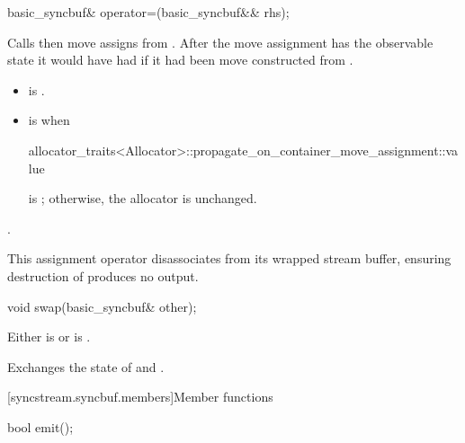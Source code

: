 %
\begin{itemdecl}
basic_syncbuf& operator=(basic_syncbuf&& rhs);
\end{itemdecl}

\begin{itemdescr}
\pnum
\effects
Calls  then
move assigns from .
After the move assignment 
has the observable state it would have had if
it had been move constructed from .

\pnum
\ensures
\begin{itemize}
\item
{} is .
\item
{} is  when
\begin{codeblock}
allocator_traits<Allocator>::propagate_on_container_move_assignment::value
\end{codeblock}
is ; otherwise, the allocator is unchanged.
\end{itemize}

\pnum
\returns
{}.

\pnum
\remarks
This assignment operator disassociates 
from its wrapped stream buffer,
ensuring destruction of  produces no output.
\end{itemdescr}

%
\begin{itemdecl}
void swap(basic_syncbuf& other);
\end{itemdecl}

\begin{itemdescr}
\pnum
\expects
Either
is 
or
is .

\pnum
\effects
Exchanges the state of  and .
\end{itemdescr}

[syncstream.syncbuf.members]{Member functions}

%
\begin{itemdecl}
bool emit();
\end{itemdecl}

